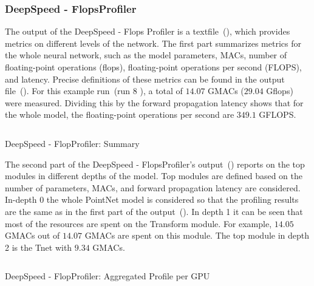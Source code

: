 \documentclass[12pt, a4paper, hidelinks]{article}
\begin{document}
\subsubsection{DeepSpeed - FlopsProfiler}
\label{sec:r-flopsprofiler}

The output of the DeepSpeed - Flops Profiler is a textfile~(), which provides metrics on different levels of the network. The first part summarizes metrics for the whole neural network, such as the model parameters, \ac{MACs}, number of floating-point operations (flops), floating-point operations per second (FLOPS), and latency. Precise definitions of these metrics can be found in the output file~(). For this example run~(run 8 ), a total of $14.07$ GMACs ($29.04$ Gflops) were measured. Dividing this by the forward propagation latency shows that for the whole model, the floating-point operations per second are $349.1$ GFLOPS.

\begin{listing}[H]
\inputminted[xleftmargin=1em,linenos,fontsize=\small, firstline=2,lastline=16, breaklines]{python}{./assets/scap_gtx1080_deepspeed_14615344_4294967294_one-epoch.txt}
\caption{DeepSpeed - FlopProfiler: Summary}
\label{lst:scap_gtx1080_deepspeed_14615344_4294967294_one-epoch-summary}
\end{listing}

The second part of the DeepSpeed - FlopsProfiler's output~() reports on the top modules in different depths of the model. Top modules are defined based on the number of parameters, \ac{MACs}, and forward propagation latency are considered. In-depth 0 the whole PointNet model is considered so that the profiling results are the same as in the first part of the output~().
In depth 1 it can be seen that most of the resources are spent on the Transform module. For example, $14.05$ GMACs out of $14.07$ GMACs are spent on this module.
The top module in depth 2 is the Tnet with $9.34$ GMACs.

\begin{listing}[H]
\inputminted[xleftmargin=1em,linenos,fontsize=\small, firstline=19,lastline=31, breaklines]{python}{./assets/scap_gtx1080_deepspeed_14615344_4294967294_one-epoch.txt}
\caption{DeepSpeed - FlopProfiler: Aggregated Profile per GPU}
\label{lst:scap_gtx1080_deepspeed_14615344_4294967294_one-epoch-aggregated}
\end{listing}
\end{document}
